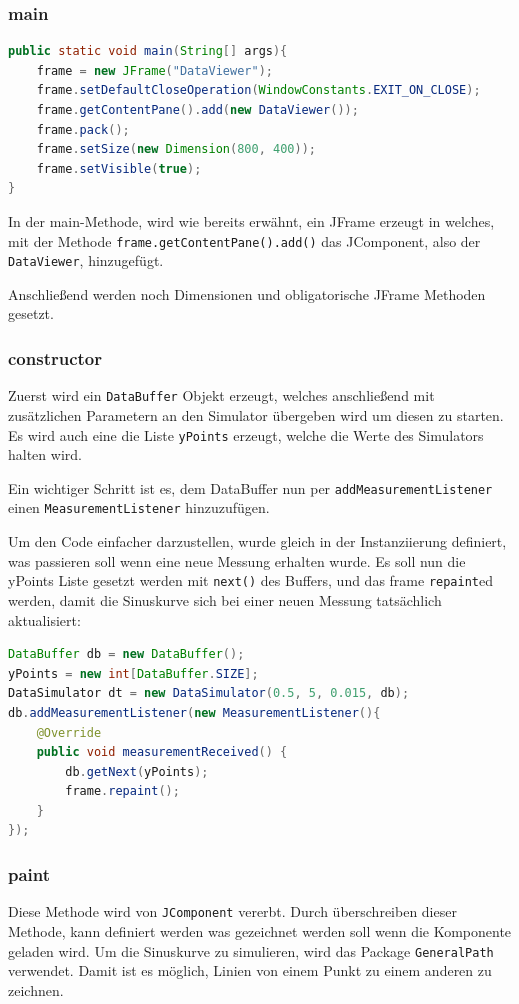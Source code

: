 \subsubsection{main}
\begin{lstlisting}[language=Java]
public static void main(String[] args){
	frame = new JFrame("DataViewer");
	frame.setDefaultCloseOperation(WindowConstants.EXIT_ON_CLOSE);
	frame.getContentPane().add(new DataViewer());
	frame.pack();
	frame.setSize(new Dimension(800, 400));
	frame.setVisible(true);
}
\end{lstlisting}
In der main-Methode, wird wie bereits erwähnt, ein JFrame erzeugt in welches, mit der Methode \verb|frame.getContentPane().add()| das JComponent, also der \verb|DataViewer|, hinzugefügt. 

Anschließend werden noch Dimensionen und obligatorische JFrame Methoden gesetzt.

\subsubsection{constructor}
Zuerst wird ein \verb|DataBuffer| Objekt erzeugt, welches anschließend mit zusätzlichen Parametern an den Simulator übergeben wird um diesen zu starten. Es wird auch eine die Liste \verb|yPoints| erzeugt, welche die Werte des Simulators halten wird.

Ein wichtiger Schritt ist es, dem DataBuffer nun per \verb|addMeasurementListener| einen \verb|MeasurementListener| hinzuzufügen.

Um den Code einfacher darzustellen, wurde gleich in der Instanziierung definiert, was passieren soll wenn eine neue Messung erhalten wurde. Es soll nun die yPoints Liste gesetzt werden mit \verb|next()| des Buffers, und das frame \verb|repaint|ed werden, damit die Sinuskurve sich bei einer neuen Messung tatsächlich aktualisiert:

\begin{lstlisting}[language=Java]
DataBuffer db = new DataBuffer();
yPoints = new int[DataBuffer.SIZE];
DataSimulator dt = new DataSimulator(0.5, 5, 0.015, db);
db.addMeasurementListener(new MeasurementListener(){
	@Override
	public void measurementReceived() {
		db.getNext(yPoints);
		frame.repaint();
	}
});
\end{lstlisting}

\subsubsection{paint}
Diese Methode wird von \verb|JComponent| vererbt. Durch überschreiben dieser Methode, kann definiert werden was gezeichnet werden soll wenn die Komponente geladen wird. Um die Sinuskurve zu simulieren, wird das Package \verb|GeneralPath| verwendet. Damit ist es möglich, Linien von einem Punkt zu einem anderen zu zeichnen. 

